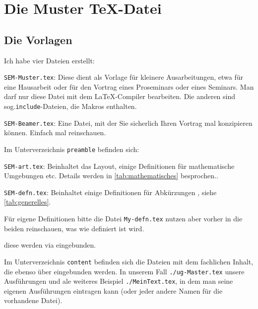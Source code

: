 \section{Die Muster \TeX{}-Datei}
\subsection{Die Vorlagen}
Ich habe vier Dateien erstellt:

\begin{myitemize}
	
	\item
	\texttt{SEM-Muster.tex}: Diese dient als Vorlage für kleinere Ausarbeitungen, etwa für eine Hausarbeit oder für den Vortrag eines Proseminars oder eines Seminars. 
		Man darf nur diese Datei mit dem \LaTeX{}-Compiler bearbeiten. 
		Die anderen sind sog.\@ \texttt{include}-Dateien, die Makros enthalten.
		
	\item
	\texttt{SEM-Beamer.tex}: Eine Datei, mit der Sie sicherlich Ihren Vortrag mal konzipieren können.
	Einfach mal reinschauen.
	
	\item
	Im Unterverzeichnis \texttt{preamble} befinden sich:
	
	\begin{myenumerate}

	\item
	\texttt{SEM-art.tex}: Beinhaltet das Layout, einige Definitionen für mathematische Umgebungen etc.\@ 
	Details werden in \vref{tab:mathematisches} besprochen.. 
	
	\item
	\texttt{SEM-defn.tex}: Beinhaltet einige Definitionen für Abkürzungen \etc, siehe \vref{tab:generelles}.
	
	\item
	Für eigene Definitionen bitte die Datei \texttt{My-defn.tex} nutzen aber vorher in die beiden \og reinschauen, was wie definiert ist \bzw wird. 
	
	\end{myenumerate}
	
	diese werden via  eingebunden.
	
	\item
	Im Unterverzeichnis \texttt{content} befinden sich die Dateien mit dem fachlichen Inhalt, die ebenso über  eingebunden werden.
	In unserem Fall \texttt{./ug-Master.tex} unsere Ausführungen und ale weiteres Beispiel \texttt{./MeinText.tex}, in dem man seine eigenen Ausführungen eintragen kann (oder jeder andere Namen für die vorhandene Datei).
		
\end{myitemize}

